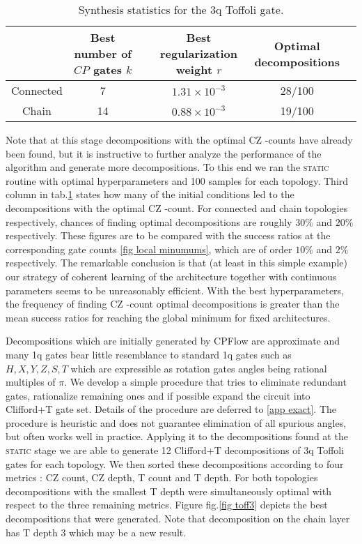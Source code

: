 \documentclass[amsfonts, amssymb, aps, nofootinbib, twocolumn]{revtex4-2}
\newcommand{\CZ}{CZ }
\newcommand{\CP}{CP }
\newcommand{\T}{T }
\newcommand{\package}[1]{\textrm {#1 }}
\newcommand{\cpflow}{\package{CPFlow}}
\newcommand{\static}{\textsc{static }}
\begin{document}
\begin{table}[]
	\begin{tabular}{@{}cccccc@{}}
		\toprule
		& \shortstack[l]{Best number of\\ $\CP$ gates $k$} && \shortstack[l]{Best regularization\\ weight $r$} &  \shortstack[l]{Optimal \\ decompositions} &  \\ \midrule
		Connected & 7      && $1.31\times10^{-3}$ & 28/100                 &  \\
		Chain     & 14     && $0.88\times10^{-3}$ & 19/100                  &  \\ \bottomrule
	\end{tabular}
\caption {Synthesis statistics for the 3q Toffoli gate.}
\label{tab toff3}
\end{table}

Note that at this stage decompositions with the optimal \CZ-counts have already been found, but it is instructive to further analyze the performance of the algorithm and generate more decompositions. To this end we ran the \static routine with optimal hyperparameters and 100 samples for each topology. Third column in tab.\ref{tab toff3} states how many of the initial conditions led to the decompositions with the optimal \CZ-count. For connected and chain topologies respectively, chances of finding optimal decompositions are roughly $30\%$ and $20\%$ respectively. These figures are to be compared with the success ratios at the corresponding gate counts \ref{fig local minumums}, which are of order $10\%$ and $2\%$ respectively. The remarkable conclusion is that (at least in this simple example) our strategy of coherent learning of the architecture together with continuous parameters seems to be unreasonably efficient. With the best hyperparameters, the frequency of finding \CZ-count optimal decompositions is greater than the mean success ratios for reaching the global minimum for fixed architectures.

Decompositions which are initially generated by \cpflow are approximate and many 1q gates bear little resemblance to standard 1q gates such as $H, X, Y, Z, S, T$  which are expressible as rotation gates angles being rational multiples of $\pi$. We develop a simple procedure that tries to eliminate redundant gates, rationalize remaining ones and if possible expand the circuit into Clifford+T gate set. Details of the procedure are deferred to \ref{app exact}. The procedure is heuristic and does not guarantee elimination of all spurious angles, but often works well in practice. Applying it to the decompositions found at the \static stage we are able to generate 12 Clifford+T decompositions of 3q Toffoli gates for each topology. We then sorted these decompositions according to four metrics : \CZ count, \CZ depth, \T count and \T depth. For both topologies decompositions with the smallest \T  depth were simultaneously optimal with respect to the three remaining metrics. Figure fig.\ref{fig toff3} depicts  the best decompositions that were generated. Note that decomposition on the chain layer has \T depth 3 which may be a new result.
\end{document}
